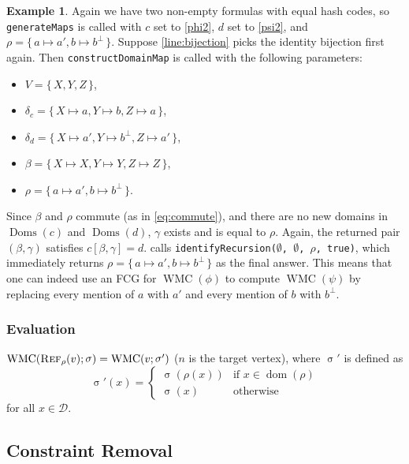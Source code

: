 \documentclass{article}
\theoremstyle{definition}
\newtheorem{example}{Example}
\theoremstyle{remark}
\DeclareMathOperator{\Reff}{\textsc{Ref}}
\DeclareMathOperator{\dom}{dom}
\DeclareMathOperator{\Doms}{Doms}
\DeclareMathOperator{\size}{\sigma}
\DeclareMathOperator{\WMC}{WMC}
\begin{document}
\begin{example}
  Again we have two non-empty formulas with equal hash codes, so \texttt{generateMaps} is called with $c$ set to \cref{phi2}, $d$ set to \cref{psi2}, and $\rho = \{\, a \mapsto a', b \mapsto b^\bot \,\}$. Suppose \cref{line:bijection} picks the identity bijection first again. Then \texttt{constructDomainMap} is called with the following parameters:
  \begin{itemize}
  \item $V = \{\, X, Y, Z \,\}$,
  \item $\delta_c = \{\, X \mapsto a, Y \mapsto b, Z \mapsto a \,\}$,
  \item $\delta_d = \{\, X \mapsto a', Y \mapsto b^\bot, Z \mapsto a' \,\}$,
  \item $\beta = \{\, X \mapsto X, Y \mapsto Y, Z \mapsto Z \,\}$,
  \item $\rho = \{\, a \mapsto a', b \mapsto b^\bot \,\}$.
  \end{itemize}
  Since $\beta$ and $\rho$ commute (as in \cref{eq:commute}), and there are no new domains in $\Doms(c)$ and $\Doms(d)$, $\gamma$ exists and is equal to $\rho$. Again, the returned pair $(\beta, \gamma)$ satisfies $c[\beta, \gamma] = d$.  calls \texttt{identifyRecursion($\emptyset$, $\emptyset$, $\rho$, true)}, which immediately returns $\rho = \{\, a \mapsto a', b \mapsto b^\bot \,\}$ as the final answer. This means that one can indeed use an FCG for $\WMC(\phi)$ to compute $\WMC(\psi)$ by replacing every mention of $a$ with $a'$ and every mention of $b$ with $b^\bot$.
\end{example}

\subsubsection{Evaluation}

$\WMC(\Reff_\rho(v); \size) = \WMC(v; \size')$ ($n$ is the target vertex), where $\size'$ is defined as
\[
\size'(x) =
\begin{cases}
  \size(\rho(x)) & \text{if } x \in \dom(\rho) \\
  \size(x) & \text{otherwise}
\end{cases}
\]
for all $x \in \mathcal{D}$.

\subsection{Constraint Removal}
\end{document}

